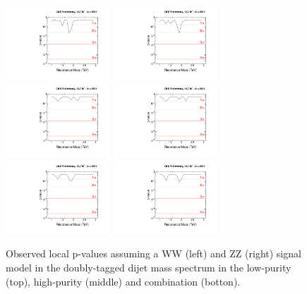 \begin{figure}[h!tpb]
\begin{center}
\includegraphics[width=0.35\textwidth]{EXO-12-024/figs/limits/pvalue_BulkWW_low_purity.pdf}
\includegraphics[width=0.35\textwidth]{EXO-12-024/figs/limits/pvalue_BulkZZ_low_purity.pdf}\\
\includegraphics[width=0.35\textwidth]{EXO-12-024/figs/limits/pvalue_BulkWW_high_purity.pdf}
\includegraphics[width=0.35\textwidth]{EXO-12-024/figs/limits/pvalue_BulkZZ_high_purity.pdf}\\
\includegraphics[width=0.35\textwidth]{EXO-12-024/figs/limits/pvalue_BulkWW_combined.pdf}
\includegraphics[width=0.35\textwidth]{EXO-12-024/figs/limits/pvalue_BulkZZ_combined.pdf}
\end{center}
\caption{Observed local p-values assuming a \GBulk WW (left) and \GBulk ZZ (right) signal model in the doubly-tagged dijet mass spectrum in the low-purity (top), high-purity (middle) and combination (botton).}
\label{fig:Vtagresults52}
\end{figure}

